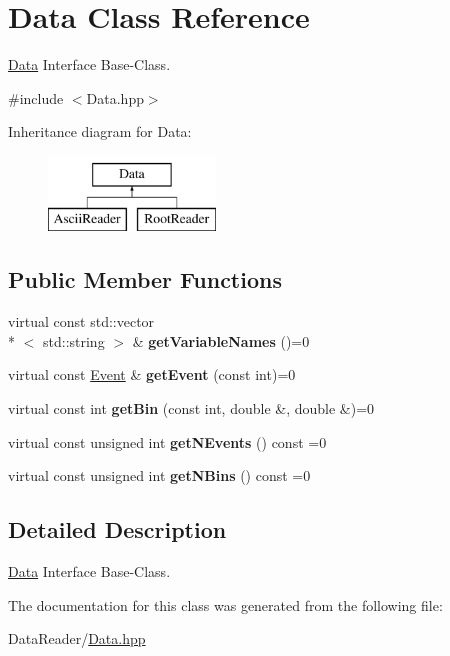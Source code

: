 \hypertarget{class_data}{\section{Data Class Reference}
\label{class_data}
}


\hyperlink{class_data}{Data} Interface Base-\/\-Class.  




{\ttfamily \#include $<$Data.\-hpp$>$}

Inheritance diagram for Data\-:\begin{figure}[H]
\begin{center}
\leavevmode
\includegraphics[height=2.000000cm]{class_data}
\end{center}
\end{figure}
\subsection*{Public Member Functions}
\begin{DoxyCompactItemize}
\item 
\hypertarget{class_data_afb361904284b3ec7f7ee365be9202661}{virtual const std\-::vector\\*
$<$ std\-::string $>$ \& {\bfseries get\-Variable\-Names} ()=0}\label{class_data_afb361904284b3ec7f7ee365be9202661}

\item 
\hypertarget{class_data_ab25e52c1eb80f21d49a10258f168e9c9}{virtual const \hyperlink{class_event}{Event} \& {\bfseries get\-Event} (const int)=0}\label{class_data_ab25e52c1eb80f21d49a10258f168e9c9}

\item 
\hypertarget{class_data_af019d4356edf7f4933deb46f4b12fcc1}{virtual const int {\bfseries get\-Bin} (const int, double \&, double \&)=0}\label{class_data_af019d4356edf7f4933deb46f4b12fcc1}

\item 
\hypertarget{class_data_acb735a761c1b22b273ee19f577438d1a}{virtual const unsigned int {\bfseries get\-N\-Events} () const =0}\label{class_data_acb735a761c1b22b273ee19f577438d1a}

\item 
\hypertarget{class_data_aaaad8bb5a7243e3d3ba299acf1fde4fb}{virtual const unsigned int {\bfseries get\-N\-Bins} () const =0}\label{class_data_aaaad8bb5a7243e3d3ba299acf1fde4fb}

\end{DoxyCompactItemize}


\subsection{Detailed Description}
\hyperlink{class_data}{Data} Interface Base-\/\-Class. 

The documentation for this class was generated from the following file\-:\begin{DoxyCompactItemize}
\item 
Data\-Reader/\hyperlink{_data_8hpp}{Data.\-hpp}\end{DoxyCompactItemize}
